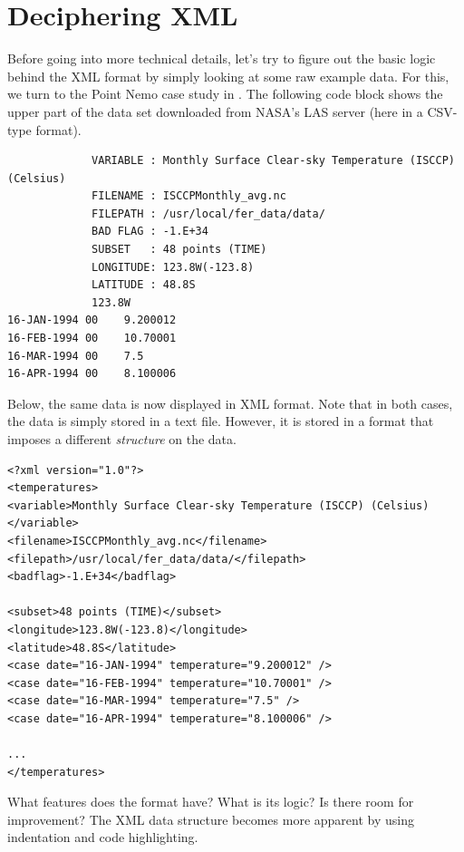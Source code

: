 \documentclass[
  12pt,
]{style/krantz}
\begin{document}
\hypertarget{deciphering-xml}{%
\section{Deciphering XML}\label{deciphering-xml}}

Before going into more technical details, let's try to figure out the basic logic behind the XML format by simply looking at some raw example data. For this, we turn to the Point Nemo case study in \citep{murrell_2009}. The following code block shows the upper part of the data set downloaded from NASA's LAS server (here in a CSV-type format).

\begin{verbatim}
             VARIABLE : Monthly Surface Clear-sky Temperature (ISCCP) (Celsius)
             FILENAME : ISCCPMonthly_avg.nc
             FILEPATH : /usr/local/fer_data/data/
             BAD FLAG : -1.E+34       
             SUBSET   : 48 points (TIME)
             LONGITUDE: 123.8W(-123.8)
             LATITUDE : 48.8S
             123.8W
16-JAN-1994 00    9.200012
16-FEB-1994 00    10.70001
16-MAR-1994 00    7.5
16-APR-1994 00    8.100006
\end{verbatim}

Below, the same data is now displayed in XML format. Note that in both cases, the data is simply stored in a text file. However, it is stored in a format that imposes a different \emph{structure} on the data.

\begin{verbatim}
<?xml version="1.0"?>
<temperatures>
<variable>Monthly Surface Clear-sky Temperature (ISCCP) (Celsius)</variable>
<filename>ISCCPMonthly_avg.nc</filename>
<filepath>/usr/local/fer_data/data/</filepath>
<badflag>-1.E+34</badflag>

<subset>48 points (TIME)</subset>
<longitude>123.8W(-123.8)</longitude>
<latitude>48.8S</latitude>
<case date="16-JAN-1994" temperature="9.200012" />
<case date="16-FEB-1994" temperature="10.70001" />
<case date="16-MAR-1994" temperature="7.5" />
<case date="16-APR-1994" temperature="8.100006" />

...
</temperatures>
\end{verbatim}

What features does the format have? What is its logic? Is there room for improvement? The XML data structure becomes more apparent by using indentation and code highlighting.
\end{document}
